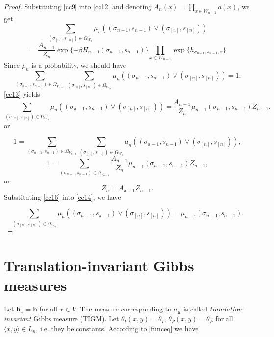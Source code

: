 \documentclass[sn-mathphys]{sn-jnl}%
\theoremstyle{thmstyleone}%
\theoremstyle{thmstyletwo}%
\theoremstyle{thmstylethree}%
\begin{document}
\begin{proof}
Substituting \eqref{cc9} into \eqref{cc12} and denoting $A_n(x)=\prod\limits_{x\in W_{n-1}}a(x)$, we get
$$\sum\limits_{(\sigma_{[n]}, s_{[n]})  \in {\Omega _{{W_n}}}} \mu_{n}((\sigma_{n-1}, s_{n-1}) \vee (\sigma_{[n]}, s_{[n]}))$$
\begin{equation}\label{cc13}
  = \frac{A_{n-1}}{Z_n}\exp\{-\beta H_{n-1}(\sigma_{n-1},s_{n-1})\} \prod\limits_{x\in W_{n-1}}\exp\{h_{\sigma_{n-1},s_{n-1},x}\}
\end{equation}
Since $\mu_{n}$ is a probability, we should have
$$\sum\limits_{(\sigma_{n-1}, s_{n-1})\in \Omega_{V_{n-1}}}\sum\limits_{(\sigma_{[n]}, s_{[n]})  \in {\Omega _{{W_n}}}} \mu_{n}((\sigma_{n-1}, s_{n-1}) \vee (\sigma_{[n]}, s_{[n]}))=1.$$
\eqref{cc13} yields
\begin{equation}\label{cc14}
\sum\limits_{(\sigma_{[n]}, s_{[n]})  \in {\Omega _{{W_n}}}} \mu_{n}((\sigma_{n-1}, s_{n-1}) \vee (\sigma_{[n]}, s_{[n]})) = \frac{A_{n-1}}{Z_n}\mu_{n-1}(\sigma_{n-1}, s_{n-1}) Z_{n-1}.
\end{equation}
or

$$1=\sum\limits_{(\sigma_{n-1}, s_{n-1})\in \Omega_{V_{n-1}}}\sum\limits_{(\sigma_{[n]}, s_{[n]})  \in {\Omega _{{W_n}}}} \mu_{n}((\sigma_{n-1}, s_{n-1}) \vee (\sigma_{[n]}, s_{[n]})),$$
\begin{equation}\label{cc15}
1=\sum\limits_{(\sigma_{n-1}, s_{n-1})\in \Omega_{V_{n-1}}}\frac{A_{n-1}}{Z_n}\mu_{n-1}(\sigma_{n-1}, s_{n-1}) Z_{n-1},
\end{equation}
or
\begin{equation}\label{cc16}
Z_n=A_{n-1}Z_{n-1}.
\end{equation}
Substituting \eqref{cc16} into \eqref{cc14}, we have

\begin{equation}\label{cc17}
\sum\limits_{(\sigma_{[n]}, s_{[n]})  \in {\Omega _{{W_n}}}} \mu_{n}((\sigma_{n-1}, s_{n-1}) \vee (\sigma_{[n]}, s_{[n]})) = \mu_{n-1}(\sigma_{n-1}, s_{n-1}).
\end{equation}
\end{proof}
\section{Translation-invariant Gibbs measures}
Let $\textbf{h}_x=\textbf{h}$ for all $x\in V$. The measure corresponding to $\mu_{\textbf{h}}$ is called \emph{translation-invariant} Gibbs measure (TIGM). Let $\theta_{I}(x,y)=\theta_{I}$, $\theta_{P}(x,y)=\theta_{P}$ for all $\langle x,y\rangle\in L_n$, i.e. they be constants.
According to \eqref{funceq} we have
\end{document}

